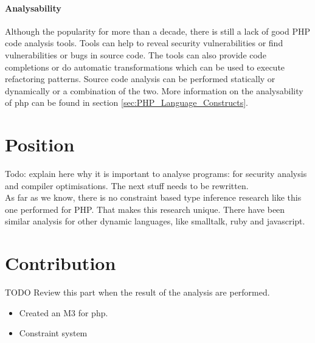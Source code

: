 \documentclass[../main.tex]{subfiles}
\begin{document}
        \paragraph{Analysability}
        Although the popularity for more than a decade, there is still a lack of good PHP code analysis tools.
        Tools can help to reveal security vulnerabilities or find vulnerabilities or bugs in source code.
        The tools can also provide code completions or do automatic transformations which can be used to execute refactoring patterns.
        Source code analysis can be performed statically or dynamically or a combination of the two.
        More information on the analysability of php can be found in section \ref{sec:PHP_Language_Constructs}.
        
    \section{Position} %
        
        Todo: explain here why it is important to analyse programs: for security analysis and compiler optimisations. The next stuff needs to be rewritten. \\
        As far as we know, there is no constraint based type inference research like this one performed for PHP.
        That makes this research unique.
        There have been similar analysis for other dynamic languages, like smalltalk, ruby and javascript.
       
    \section{Contribution} %
        TODO Review this part when the result of the analysis are performed.
        \begin{itemize}
            \item Created an M3 for php.
            \item Constraint system
        \end{itemize}
\end{document}
